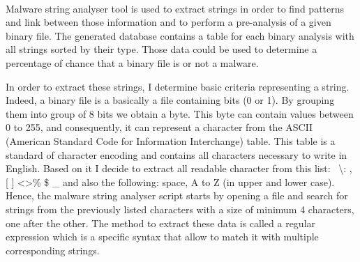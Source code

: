 \paragraph{}

Malware string analyser tool is used to extract strings in order to find patterns and link 
between those information and to perform a pre-analysis of a given binary file.
The generated database contains a table for each binary analysis with all strings sorted
by their type. Those data could be used to determine a percentage of chance that
a binary file is or not a malware.

In order to extract these strings, I determine basic criteria representing a string. Indeed,
a binary file is a basically a file containing bits (0 or 1). By grouping them into group of
8 bits we obtain a byte. This byte can contain values between 0 to 255, and consequently, it
can represent a character from the ASCII (American Standard Code for Information Interchange)
table. This table is a standard of character encoding and contains all characters necessary
to write in English. Based on it I decide to extract all readable character from this
list: \ \textbackslash : , [ ] \textless \textgreater \% \$ \_  and also the following: space, A to Z (in upper and lower case).
Hence, the malware string analyser script starts by opening a file and search for strings from 
the previously listed characters with a size of minimum 4 characters, one after the other.
The method to extract these data is called a regular expression which is a specific syntax 
that allow to match it with multiple corresponding strings.


